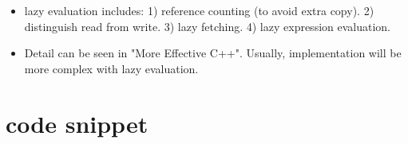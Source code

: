 \documentclass[a4paper,11pt,twoside]{book}
\begin{document}
\begin{itemize}
\end{itemize}

\begin{itemize}
	\item  lazy evaluation includes:
1) reference counting (to avoid extra copy).
2) distinguish read from write.
3) lazy fetching.
4) lazy expression evaluation.

	\item Detail can be seen in "More Effective C++". Usually, implementation will be  more complex with lazy evaluation.
\end{itemize}


\section{code snippet}
\end{document}

